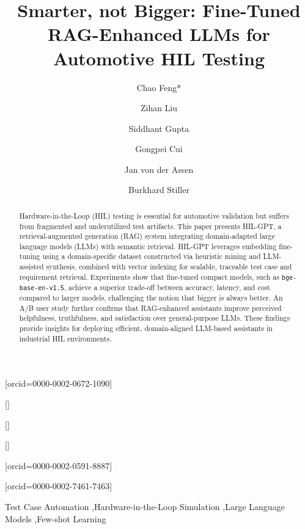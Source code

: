 \documentclass[a4paper,fleqn]{cas-dc}
\begin{document}
\let\WriteBookmarks\relax
\def\floatpagepagefraction{1}
\def\textpagefraction{.001}

\title[mode = title]{Smarter, not Bigger: Fine-Tuned RAG-Enhanced LLMs for Automotive HIL Testing}

\author[1]{Chao {Feng}*}[orcid=0000-0002-0672-1090]
\author[1]{Zihan {Liu}}[]
\author[2]{Siddhant {Gupta}}[]
\author[2]{Gongpei {Cui}}[]
\author[1]{Jan {von der Assen}}[orcid=0000-0002-0591-8887]
\author[1]{Burkhard {Stiller}}[orcid=0000-0002-7461-7463]


\address[1]{Communication Systems Group CSG, Department of Informatics IfI, University of Zurich UZH, 8050 Zürich, Switzerland}
\address[2]{Volvo Car Corporation, 405 31 Göteborg, Sweden}




\begin{keywords}
Test Case Automation \sep Hardware-in-the-Loop Simulation \sep Large Language Models \sep Few-shot Learning
\end{keywords}

\maketitle

\begin{abstract}
Hardware-in-the-Loop (HIL) testing is essential for automotive validation but suffers from fragmented and underutilized test artifacts. This paper presents HIL-GPT, a retrieval-augmented generation (RAG) system integrating domain-adapted large language models (LLMs) with semantic retrieval. HIL-GPT leverages embedding fine-tuning using a domain-specific dataset constructed via heuristic mining and LLM-assisted synthesis, combined with vector indexing for scalable, traceable test case and requirement retrieval. Experiments show that fine-tuned compact models, such as \texttt{bge-base-en-v1.5}, achieve a superior trade-off between accuracy, latency, and cost compared to larger models, challenging the notion that bigger is always better. An A/B user study further confirms that RAG-enhanced assistants improve perceived helpfulness, truthfulness, and satisfaction over general-purpose LLMs. These findings provide insights for deploying efficient, domain-aligned LLM-based assistants in industrial HIL environments.
\end{abstract}
\end{document}
